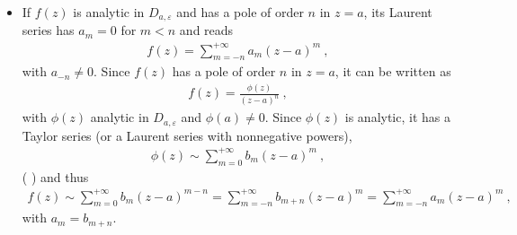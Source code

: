 \documentclass[letterpaper,10pt,english]{jupyterBook}
\begin{document}
\sphinxAtStartPar
{}
\begin{itemize}
\item {} 
\sphinxAtStartPar
If \(f(z)\) is analytic in \(D_{a,\varepsilon}\) and has a pole of order \(n\) in \(z = a\), its Laurent series has \(a_m=0\) for \(m < n\) and reads
\begin{equation}\label{equation:ch/complex/analysis:eq:laurent:pole-n}
\begin{split}f(z) = \sum_{m=-n}^{+\infty} a_m (z-a)^m \ ,\end{split}
\end{equation}
\sphinxAtStartPar
with \(a_{-n} \ne 0\). Since \(f(z)\) has a pole of order \(n\) in \(z = a\), it can be written as
\begin{equation*}
\begin{split}f(z) = \frac{\phi(z)}{(z-a)^n} \ ,\end{split}
\end{equation*}
\sphinxAtStartPar
with \(\phi(z)\) analytic in \(D_{a,\varepsilon}\) and \(\phi(a) \ne 0\). Since \(\phi(z)\) is analytic, it has a Taylor series (or a Laurent series with non\sphinxhyphen{}negative powers),
\begin{equation*}
\begin{split}\phi(z) \sim \sum_{m=0}^{+\infty} b_m (z-a)^m \ ,\end{split}
\end{equation*}
\sphinxAtStartPar
( ) and thus
\begin{equation*}
\begin{split}f(z) \sim \sum_{m=0}^{+\infty} b_m (z-a)^{m-n} = \sum_{m=-n}^{+\infty} b_{m+n} (z-a)^{m} = \sum_{m=-n}^{+\infty} a_{m} (z-a)^m \ , \end{split}
\end{equation*}
\sphinxAtStartPar
with \(a_m = b_{m+n}\).


\end{itemize}
\end{document}
